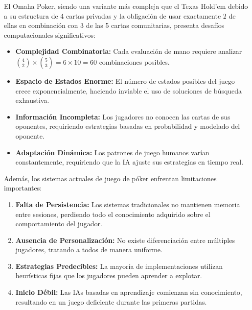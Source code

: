 \documentclass[12pt,a4paper]{article}
\begin{document}
El Omaha Poker, siendo una variante más compleja que el Texas Hold'em debido a su estructura de 4 cartas privadas y la obligación de usar exactamente 2 de ellas en combinación con 3 de las 5 cartas comunitarias, presenta desafíos computacionales significativos:

\begin{itemize}[leftmargin=2cm]
    \item \textbf{Complejidad Combinatoria:} Cada evaluación de mano requiere analizar $\binom{4}{2} \times \binom{5}{3} = 6 \times 10 = 60$ combinaciones posibles.
    
    \item \textbf{Espacio de Estados Enorme:} El número de estados posibles del juego crece exponencialmente, haciendo inviable el uso de soluciones de búsqueda exhaustiva.
    
    \item \textbf{Información Incompleta:} Los jugadores no conocen las cartas de sus oponentes, requiriendo estrategias basadas en probabilidad y modelado del oponente.
    
    \item \textbf{Adaptación Dinámica:} Los patrones de juego humanos varían constantemente, requiriendo que la IA ajuste sus estrategias en tiempo real.
\end{itemize}

Además, los sistemas actuales de juego de póker enfrentan limitaciones importantes:

\begin{enumerate}
    \item \textbf{Falta de Persistencia:} Los sistemas tradicionales no mantienen memoria entre sesiones, perdiendo todo el conocimiento adquirido sobre el comportamiento del jugador.
    
    \item \textbf{Ausencia de Personalización:} No existe diferenciación entre múltiples jugadores, tratando a todos de manera uniforme.
    
    \item \textbf{Estrategias Predecibles:} La mayoría de implementaciones utilizan heurísticas fijas que los jugadores pueden aprender a explotar.
    
    \item \textbf{Inicio Débil:} Las IAs basadas en aprendizaje comienzan sin conocimiento, resultando en un juego deficiente durante las primeras partidas.
\end{enumerate}
\end{document}

